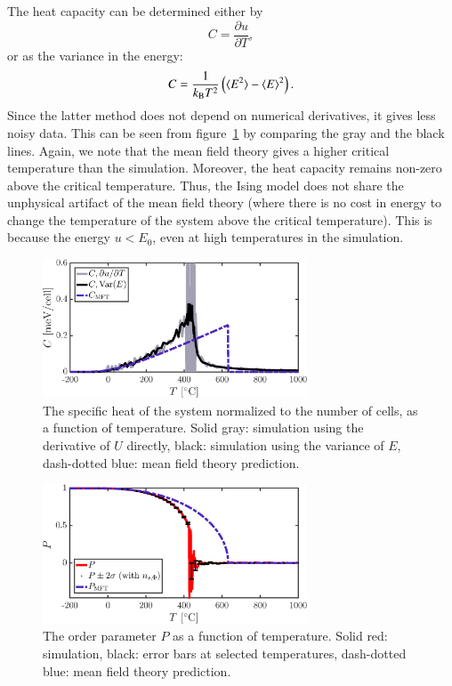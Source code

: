 The heat capacity can be determined either by 
\begin{equation}
C = \frac{\partial u}{\partial T},
\label{eq:C1}
\end{equation}
or as the variance in the energy:
\begin{equation}
C = \frac{1}{k_{\rm B} T^2}\left(\langle E^2 \rangle  - \langle E \rangle^2 \right)
\label{eq:C2}.
\end{equation}
Since the latter method does not depend on numerical derivatives, it gives less noisy data. This can be seen from figure~\ref{fig:C} by comparing the gray and the black lines. Again, we note that the mean field theory gives a higher critical temperature than the simulation. Moreover, the heat capacity remains non-zero above the critical temperature. Thus, the Ising model does not share  the unphysical artifact of the mean field theory (where there is no cost in energy to change the temperature of the system above the critical temperature). This is because the energy $u < E_0$, even at high temperatures in the simulation. 

\begin{figure}[!ht]
\begin{center}
  \includegraphics[width=0.7\textwidth]{../figures/C} 
  \caption{The specific heat of the system normalized to the number of cells, as a function of temperature. Solid gray: simulation using the derivative of $U$ directly, black: simulation using the variance of $E$, dash-dotted blue: mean field theory prediction.}
  \label{fig:C}
\end{center}
\end{figure}

\begin{figure}[!ht]
\begin{center}
  \includegraphics[width=0.7\textwidth]{../figures/P} 
  \caption{The order parameter $P$ as a function of temperature. Solid red: simulation, black: error bars at selected temperatures, dash-dotted blue: mean field theory prediction.}
  \label{fig:P}
\end{center}
\end{figure}

